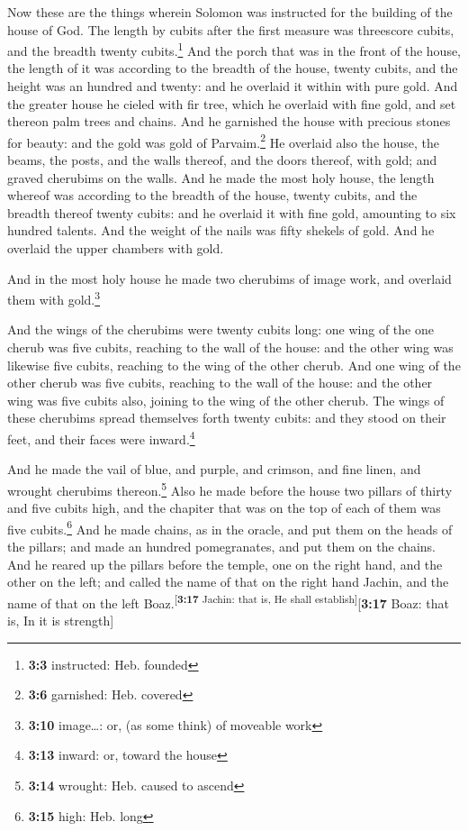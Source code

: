  Now these are the things wherein Solomon was instructed
for the building of the house of God. The length by cubits after the
first measure was threescore cubits, and the breadth twenty
cubits.\footnote{\textbf{3:3} instructed: Heb. founded} 
And the porch that was in the front of the house, the length of it was
according to the breadth of the house, twenty cubits, and the height was
an hundred and twenty: and he overlaid it within with pure gold.
 And the greater house he cieled with fir tree, which he
overlaid with fine gold, and set thereon palm trees and chains.
 And he garnished the house with precious stones for
beauty: and the gold was gold of Parvaim.\footnote{\textbf{3:6}
  garnished: Heb. covered}  He overlaid also the house,
the beams, the posts, and the walls thereof, and the doors thereof, with
gold; and graved cherubims on the walls.  And he made the
most holy house, the length whereof was according to the breadth of the
house, twenty cubits, and the breadth thereof twenty cubits: and he
overlaid it with fine gold, amounting to six hundred talents.
 And the weight of the nails was fifty shekels of gold.
And he overlaid the upper chambers with gold.

 And in the most holy house he made two cherubims of
image work, and overlaid them with gold.\footnote{\textbf{3:10}
  image\ldots: or, (as some think) of moveable work}

 And the wings of the cherubims were twenty cubits long:
one wing of the one cherub was five cubits, reaching to the wall of the
house: and the other wing was likewise five cubits, reaching to the wing
of the other cherub.  And one wing of the other cherub
was five cubits, reaching to the wall of the house: and the other wing
was five cubits also, joining to the wing of the other cherub.
 The wings of these cherubims spread themselves forth
twenty cubits: and they stood on their feet, and their faces were
inward.\footnote{\textbf{3:13} inward: or, toward the house}

 And he made the vail of blue, and purple, and crimson,
and fine linen, and wrought cherubims thereon.\footnote{\textbf{3:14}
  wrought: Heb. caused to ascend}  Also he made before
the house two pillars of thirty and five cubits high, and the chapiter
that was on the top of each of them was five cubits.\footnote{\textbf{3:15}
  high: Heb. long}  And he made chains, as in the oracle,
and put them on the heads of the pillars; and made an hundred
pomegranates, and put them on the chains.  And he reared
up the pillars before the temple, one on the right hand, and the other
on the left; and called the name of that on the right hand Jachin, and
the name of that on the left Boaz.\textsuperscript{{[}\textbf{3:17}
Jachin: that is, He shall establish{]}}{[}\textbf{3:17} Boaz: that is,
In it is strength{]}

